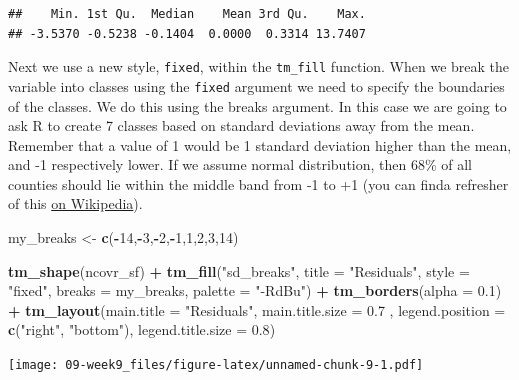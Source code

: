 \documentclass[]{book}
\newenvironment{Shaded}{\begin{snugshade}}{\end{snugshade}}
\newcommand{\DataTypeTok}[1]{\textcolor[rgb]{0.13,0.29,0.53}{#1}}
\newcommand{\DecValTok}[1]{\textcolor[rgb]{0.00,0.00,0.81}{#1}}
\newcommand{\FloatTok}[1]{\textcolor[rgb]{0.00,0.00,0.81}{#1}}
\newcommand{\KeywordTok}[1]{\textcolor[rgb]{0.13,0.29,0.53}{\textbf{#1}}}
\newcommand{\NormalTok}[1]{#1}
\newcommand{\OperatorTok}[1]{\textcolor[rgb]{0.81,0.36,0.00}{\textbf{#1}}}
\newcommand{\StringTok}[1]{\textcolor[rgb]{0.31,0.60,0.02}{#1}}
\begin{document}
\begin{verbatim}
##    Min. 1st Qu.  Median    Mean 3rd Qu.    Max. 
## -3.5370 -0.5238 -0.1404  0.0000  0.3314 13.7407
\end{verbatim}

Next we use a new style, \texttt{fixed}, within the \texttt{tm\_fill} function. When we break the variable into classes using the \texttt{fixed} argument we need to specify the boundaries of the classes. We do this using the breaks argument. In this case we are going to ask R to create 7 classes based on standard deviations away from the mean. Remember that a value of 1 would be 1 standard deviation higher than the mean, and -1 respectively lower. If we assume normal distribution, then 68\% of all counties should lie within the middle band from -1 to +1 (you can finda refresher of this \href{https://en.wikipedia.org/wiki/68\%E2\%80\%9395\%E2\%80\%9399.7_rule}{on Wikipedia}).

\begin{Shaded}
\begin{Highlighting}[]
\NormalTok{my_breaks <-}\StringTok{ }\KeywordTok{c}\NormalTok{(}\OperatorTok{-}\DecValTok{14}\NormalTok{,}\OperatorTok{-}\DecValTok{3}\NormalTok{,}\OperatorTok{-}\DecValTok{2}\NormalTok{,}\OperatorTok{-}\DecValTok{1}\NormalTok{,}\DecValTok{1}\NormalTok{,}\DecValTok{2}\NormalTok{,}\DecValTok{3}\NormalTok{,}\DecValTok{14}\NormalTok{)}

\KeywordTok{tm_shape}\NormalTok{(ncovr_sf) }\OperatorTok{+}\StringTok{ }
\StringTok{  }\KeywordTok{tm_fill}\NormalTok{(}\StringTok{"sd_breaks"}\NormalTok{, }\DataTypeTok{title =} \StringTok{"Residuals"}\NormalTok{, }\DataTypeTok{style =} \StringTok{"fixed"}\NormalTok{, }\DataTypeTok{breaks =}\NormalTok{ my_breaks, }\DataTypeTok{palette =} \StringTok{"-RdBu"}\NormalTok{) }\OperatorTok{+}
\StringTok{  }\KeywordTok{tm_borders}\NormalTok{(}\DataTypeTok{alpha =} \FloatTok{0.1}\NormalTok{) }\OperatorTok{+}
\StringTok{  }\KeywordTok{tm_layout}\NormalTok{(}\DataTypeTok{main.title =} \StringTok{"Residuals"}\NormalTok{, }\DataTypeTok{main.title.size =} \FloatTok{0.7}\NormalTok{ ,}
            \DataTypeTok{legend.position =} \KeywordTok{c}\NormalTok{(}\StringTok{"right"}\NormalTok{, }\StringTok{"bottom"}\NormalTok{), }\DataTypeTok{legend.title.size =} \FloatTok{0.8}\NormalTok{)}
\end{Highlighting}
\end{Shaded}

\texttt{[image: 09-week9\_files/figure-latex/unnamed-chunk-9-1.pdf]}
\end{document}

